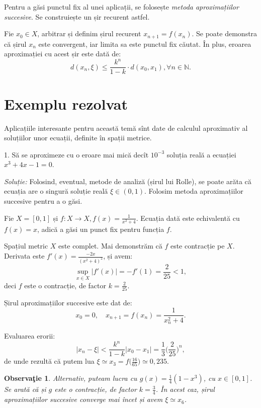 \documentclass[11pt,a4paper]{article}
\newcommand\NN{\mathbb{N}}
\theoremstyle{dotless}
\theoremstyle{dotlessdr}
\newtheorem{remark}{Observa\c{t}ie}[section]
\begin{document}
Pentru a găsi punctul fix al unei aplicații, se folosește \emph{metoda %
  aproximațiilor succesive}. Se construiește un șir recurent astfel.

Fie $x_0 \in X$, arbitrar și definim șirul recurent $x_{n+1} = f(x_n)$.
Se poate demonstra că șirul $x_n$ este convergent, iar limita sa este punctul
fix căutat. În plus, eroarea aproximației cu acest șir este dată de:
\[
  d(x_n, \xi) \leq \frac{k^n}{1 - k} \cdot d(x_0, x_1), \forall n \in \NN.
\]


\section{Exemplu rezolvat}
\label{sec:ex-rez}

Aplicațiile interesante pentru această temă sînt date de calculul aproximativ
al soluțiilor unor ecuații, definite în spații metrice.

1. Să se aproximeze cu o eroare mai mică decît $10^{-3}$ soluția reală a
ecuației $x^3 + 4x - 1 = 0$.

\emph{Soluție:} Folosind, eventual, metode de analiză (șirul lui Rolle),
se poate arăta că ecuația are o singură soluție reală $\xi \in (0, 1)$.
Folosim metoda aproximațiilor succesive pentru a o găsi.

Fie $X = [0, 1]$ și $f: X \to X, f(x) = \frac{1}{x^2 + 4}$. Ecuația dată este
echivalentă cu $f(x) = x$, adică a găsi un punct fix pentru funcția $f$.

Spațiul metric $X$ este complet. Mai demonstrăm că $f$ este contracție
pe $X$. Derivata este $f'(x) = \frac{-2x}{(x^2 + 4)^2}$, și avem:
\[
  \sup_{x \in X} | f'(x) | = -f'(1) = \frac{2}{25} < 1,
\]
deci $f$ este o contracție, de factor $k = \frac{2}{25}$.

Șirul aproximațiilor succesive este dat de:
\[
  x_0 = 0, \quad x_{n + 1} = f(x_n) = \frac{1}{x_n^2 + 4}.
\]

Evaluarea erorii:
\[
  |x_n - \xi| < \frac{k^n}{1 - k}|x_0 - x_1| = \frac{1}{3} \Big( \frac{2}{25} \Big)^n,
\]
de unde rezultă că putem lua $\xi \simeq x_3 = f \big(\frac{16}{65}\big) \simeq 0,235$.

\begin{remark}\label{rk:alternativ}
  Alternativ, puteam lucra cu $g(x) = \frac{1}{4} (1 - x^3)$, cu $x \in [0, 1]$.
  Se arată că și $g$ este o contracție, de factor $k = \frac{3}{4}$. În acest caz,
  șirul aproximațiilor succesive converge mai încet și avem $\xi \simeq x_6$.
\end{remark}
\end{document}

